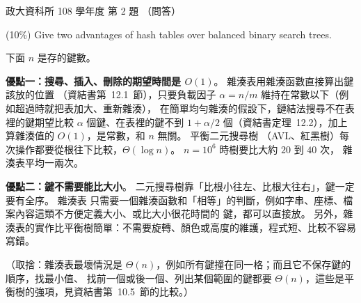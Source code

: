 \begin{pastexam}[label={px:nccu-108-dsa-02}]{政大資科所 108 學年度 第 2 題}
（問答）

(10\%) Give two advantages of hash tables over balanced binary search trees.
\end{pastexam}

\begin{pastsoln}
下面 $n$ 是存的鍵數。

\textbf{優點一：搜尋、插入、刪除的期望時間是 $O(1)$}。 雜湊表用雜湊函數直接算出鍵該放的位置
（資結書第~12.1~節），只要負載因子 $\alpha = n/m$ 維持在常數以下（例如超過時就把表加大、重新雜湊），
在簡單均勻雜湊的假設下，鏈結法搜尋不在表裡的鍵期望比較 $\alpha$ 個鍵、在表裡的鍵不到
$1 + \alpha/2$ 個（資結書定理~12.2），加上算雜湊值的 $O(1)$，是常數，和 $n$ 無關。 平衡二元搜尋樹
（AVL、紅黑樹）每次操作都要從根往下比較，$\Theta(\log n)$。 $n = 10^6$ 時樹要比大約 $20$ 到 $40$ 次，
雜湊表平均一兩次。

\textbf{優點二：鍵不需要能比大小}。 二元搜尋樹靠「比根小往左、比根大往右」，鍵一定要有全序。 雜湊表
只需要一個雜湊函數和「相等」的判斷，例如字串、座標、檔案內容這類不方便定義大小、或比大小很花時間的
鍵，都可以直接放。 另外，雜湊表的實作比平衡樹簡單：不需要旋轉、顏色或高度的維護，程式短、比較不容易
寫錯。

（取捨：雜湊表最壞情況是 $\Theta(n)$，例如所有鍵撞在同一格；而且它不保存鍵的順序，找最小值、
找前一個或後一個、列出某個範圍的鍵都要 $\Theta(n)$，這些是平衡樹的強項，見資結書第~10.5~節的比較。）
\end{pastsoln}
